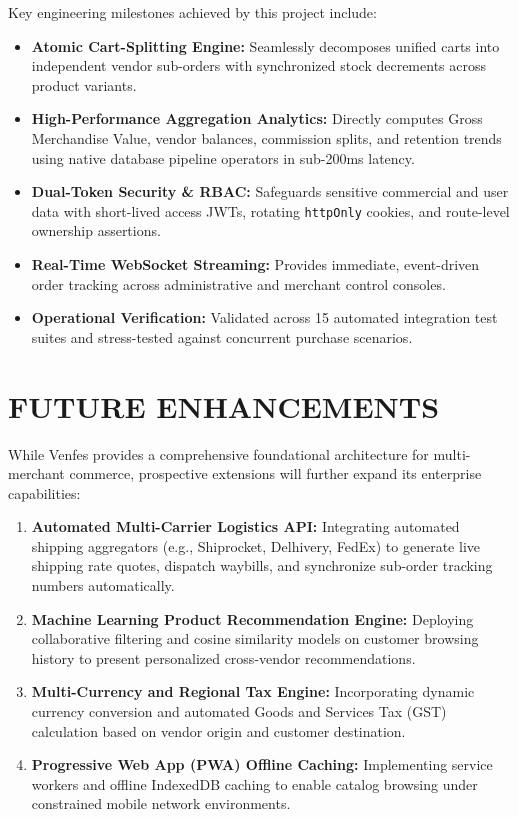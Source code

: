 \documentclass[12pt,a4paper]{report}
\begin{document}
Key engineering milestones achieved by this project include:
\begin{itemize}[leftmargin=1.5cm]
    \item \textbf{Atomic Cart-Splitting Engine:} Seamlessly decomposes unified carts into independent vendor sub-orders with synchronized stock decrements across product variants.
    \item \textbf{High-Performance Aggregation Analytics:} Directly computes Gross Merchandise Value, vendor balances, commission splits, and retention trends using native database pipeline operators in sub-200ms latency.
    \item \textbf{Dual-Token Security \& RBAC:} Safeguards sensitive commercial and user data with short-lived access JWTs, rotating \texttt{httpOnly} cookies, and route-level ownership assertions.
    \item \textbf{Real-Time WebSocket Streaming:} Provides immediate, event-driven order tracking across administrative and merchant control consoles.
    \item \textbf{Operational Verification:} Validated across 15 automated integration test suites and stress-tested against concurrent purchase scenarios.
\end{itemize}

\section{FUTURE ENHANCEMENTS}
While Venfes provides a comprehensive foundational architecture for multi-merchant commerce, prospective extensions will further expand its enterprise capabilities:
\begin{enumerate}[leftmargin=1.5cm]
    \item \textbf{Automated Multi-Carrier Logistics API:} Integrating automated shipping aggregators (e.g., Shiprocket, Delhivery, FedEx) to generate live shipping rate quotes, dispatch waybills, and synchronize sub-order tracking numbers automatically.
    \item \textbf{Machine Learning Product Recommendation Engine:} Deploying collaborative filtering and cosine similarity models on customer browsing history to present personalized cross-vendor recommendations.
    \item \textbf{Multi-Currency and Regional Tax Engine:} Incorporating dynamic currency conversion and automated Goods and Services Tax (GST) calculation based on vendor origin and customer destination.
    \item \textbf{Progressive Web App (PWA) Offline Caching:} Implementing service workers and offline IndexedDB caching to enable catalog browsing under constrained mobile network environments.
\end{enumerate}
\end{document}
